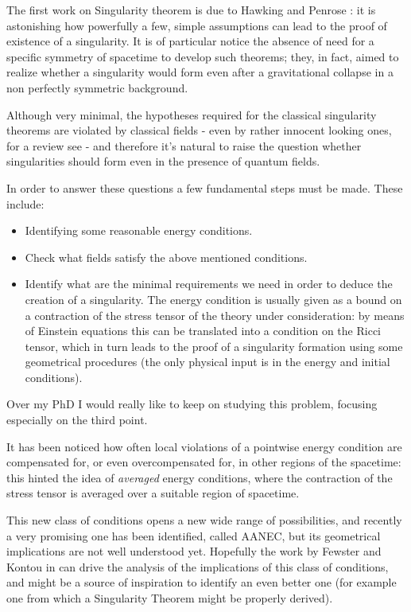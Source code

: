 \documentclass[12pt, a4paper]{article}
\begin{document}
The first work on Singularity theorem is due to Hawking \cite{hawking1966occurrence} and Penrose \cite{penrose1965gravitational}: it is astonishing how powerfully a few, simple assumptions can lead to the proof of existence of a singularity.
It is of particular notice the absence of need for a specific symmetry of spacetime to develop such theorems; they, in fact, aimed to realize whether a singularity would form even after a gravitational collapse in a non perfectly symmetric background. 

Although very minimal, the hypotheses required for the classical singularity theorems are violated by classical fields - even by rather innocent looking ones, for a review see \cite{kontou2020energy} - and therefore it's natural to raise the question whether singularities should form even in the presence of quantum fields.

In order to answer these questions a few fundamental steps must be made. These include:
\begin{itemize}
	\item Identifying some reasonable energy conditions.
	\item Check what fields satisfy the above mentioned conditions.
	\item Identify what are the minimal requirements we need in order to deduce the creation of a singularity. 
	The energy condition is usually given as a bound on a contraction of the stress tensor of the theory under consideration: by means of Einstein equations this can be translated into a condition on the Ricci tensor, which in turn leads to the proof of a singularity formation using some geometrical procedures (the only physical input is in the energy and initial conditions).
\end{itemize}

Over my PhD I would really like to keep on studying this problem, focusing especially on the third point. 

It has been noticed how often local violations of a pointwise energy condition are compensated for, or even overcompensated for, in other regions of the spacetime: this hinted the idea of \emph{averaged} energy conditions, where the contraction of the stress tensor is averaged over a suitable region of spacetime.

This new class of conditions opens a new wide range of possibilities, and recently a very promising one has been identified, called AANEC, but its geometrical implications are not well understood yet. Hopefully the work by Fewster and Kontou in \cite{fewster2020new} can drive the analysis of the implications of this class of conditions, and might be a source of inspiration to identify an even better one (for example one from which a Singularity Theorem might be properly derived).
\end{document}
